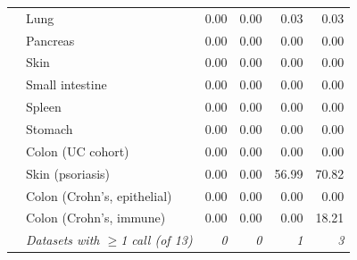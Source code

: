 \begin{table}[htbp]
\begin{tabular}{@{}llrrrr@{}}
 & Lung & 0.00 & 0.00 & 0.03 & 0.03 \\
 & Pancreas & 0.00 & 0.00 & 0.00 & 0.00 \\
 & Skin & 0.00 & 0.00 & 0.00 & 0.00 \\
 & Small intestine & 0.00 & 0.00 & 0.00 & 0.00 \\
 & Spleen & 0.00 & 0.00 & 0.00 & 0.00 \\
 & Stomach & 0.00 & 0.00 & 0.00 & 0.00 \\
 & Colon (UC cohort) & 0.00 & 0.00 & 0.00 & 0.00 \\
 & Skin (psoriasis) & 0.00 & 0.00 & 56.99 & 70.82 \\
 & Colon (Crohn's, epithelial) & 0.00 & 0.00 & 0.00 & 0.00 \\
 & Colon (Crohn's, immune) & 0.00 & 0.00 & 0.00 & 18.21 \\
 & \textit{Datasets with $\geq$1 call (of 13)} & \textit{0} & \textit{0} & \textit{1} & \textit{3} \\
\bottomrule
\end{tabular}
\end{table}
